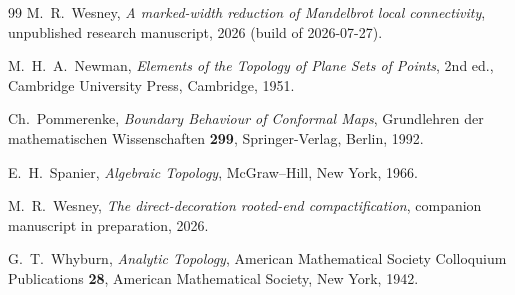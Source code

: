 \documentclass[11pt,reqno]{amsart}
\theoremstyle{definition}
\theoremstyle{remark}
\begin{document}
\begin{thebibliography}{99}
M.~R.~Wesney,
\emph{A marked-width reduction of Mandelbrot local connectivity},
unpublished research manuscript, 2026 (build of 2026-07-27).

M.~H.~A.~Newman,
\emph{Elements of the Topology of Plane Sets of Points},
2nd ed., Cambridge University Press, Cambridge, 1951.

Ch.~Pommerenke,
\emph{Boundary Behaviour of Conformal Maps},
Grundlehren der mathematischen Wissenschaften \textbf{299},
Springer-Verlag, Berlin, 1992.

E.~H.~Spanier,
\emph{Algebraic Topology},
McGraw--Hill, New York, 1966.

M.~R.~Wesney,
\emph{The direct-decoration rooted-end compactification},
companion manuscript in preparation, 2026.

G.~T.~Whyburn,
\emph{Analytic Topology},
American Mathematical Society Colloquium Publications \textbf{28},
American Mathematical Society, New York, 1942.

\end{thebibliography}
\end{document}
